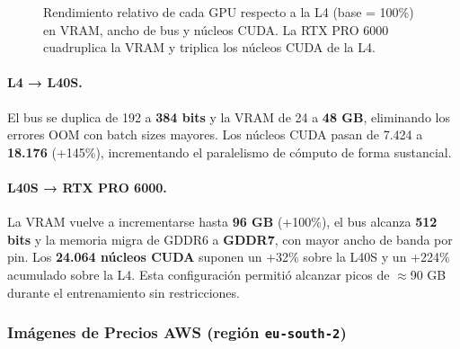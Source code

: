 \begin{figure}[H]
\centering
{}
\caption{Rendimiento relativo de cada GPU respecto a la L4 (base = 100\%) en VRAM, ancho de bus y núcleos CUDA. La RTX PRO 6000 cuadruplica la VRAM y triplica los núcleos CUDA de la L4.}
\label{fig:gpu_comparison}
\end{figure}

\paragraph{L4 → L40S.} El bus se duplica de 192 a \textbf{384 bits} y la VRAM de 24 a \textbf{48 GB}, eliminando los errores OOM con batch sizes mayores. Los núcleos CUDA pasan de 7.424 a \textbf{18.176} (+145\%), incrementando el paralelismo de cómputo de forma sustancial.

\paragraph{L40S → RTX PRO 6000.} La VRAM vuelve a incrementarse hasta \textbf{96 GB} (+100\%), el bus alcanza \textbf{512 bits} y la memoria migra de GDDR6 a \textbf{GDDR7}, con mayor ancho de banda por pin. Los \textbf{24.064 núcleos CUDA} suponen un +32\% sobre la L40S y un +224\% acumulado sobre la L4. Esta configuración permitió alcanzar picos de $\approx$90 GB durante el entrenamiento sin restricciones.

\subsubsection{Imágenes de Precios AWS (región \texttt{eu-south-2})}

